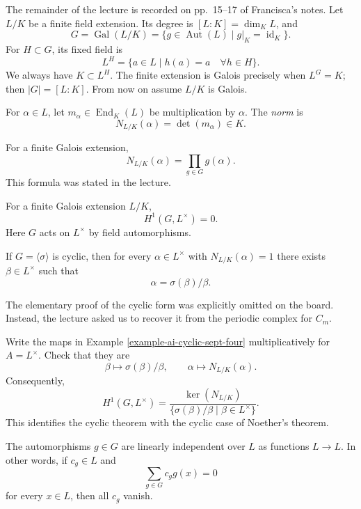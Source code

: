 \noindent
The remainder of the lecture is recorded
on pp.~15--17 of Francisca's notes.
Let $L/K$ be a finite field extension.
Its degree is $[L:K]=\dim_K L$, and
$$
G=\operatorname{Gal}(L/K)
=\{g\in\operatorname{Aut}(L)\mid
g|_K=\operatorname{id}_K\}.
$$
For $H\subset G$, its fixed field is
$$
L^H=\{a\in L\mid h(a)=a
\quad\forall h\in H\}.
$$
We always have $K\subset L^H$.
The finite extension is Galois precisely
when $L^G=K$; then $|G|=[L:K]$.
From now on assume $L/K$ is Galois.

\begin{definition}
\label{definition-galois-norm-4-sept}
For $\alpha\in L$, let
$m_\alpha\in\operatorname{End}_K(L)$
be multiplication by $\alpha$.
The \emph{norm} is
$$
N_{L/K}(\alpha)=\det(m_\alpha)\in K.
$$
\end{definition}

\noindent
For a finite Galois extension,
$$
N_{L/K}(\alpha)=\prod_{g\in G}g(\alpha).
$$
This formula was stated in the lecture.

\begin{theorem}[Noether]
\label{theorem-noether-hilbert-90-4-sept}
For a finite Galois extension $L/K$,
$$
H^1(G,L^{\times})=0.
$$
Here $G$ acts on $L^{\times}$ by field
automorphisms.
\end{theorem}

\begin{theorem}
\label{theorem-hilbert-90-cyclic-4-sept}
If $G=\langle\sigma\rangle$ is cyclic,
then for every $\alpha\in L^{\times}$
with $N_{L/K}(\alpha)=1$ there exists
$\beta\in L^{\times}$ such that
$$
\alpha=\sigma(\beta)/\beta.
$$
\end{theorem}

\noindent
The elementary proof of the cyclic form
was explicitly omitted on the board.
Instead, the lecture asked us to recover
it from the periodic complex for $C_m$.

\begin{exercise}
\label{exercise-hilbert-90-cyclic-4-sept}
Write the maps in Example
\ref{example-ai-cyclic-sept-four}
multiplicatively for $A=L^{\times}$.
Check that they are
$$
\beta\longmapsto\sigma(\beta)/\beta,
\qquad \alpha\longmapsto N_{L/K}(\alpha).
$$
Consequently,
$$
H^1(G,L^{\times})
=\frac{\ker(N_{L/K})}
{\{\sigma(\beta)/\beta
\mid\beta\in L^{\times}\}}.
$$
This identifies the cyclic theorem with
the cyclic case of Noether's theorem.
\end{exercise}

\begin{lemma}
\label{lemma-artin-4-sept}
The automorphisms $g\in G$ are linearly
independent over $L$ as functions $L\to L$.
In other words, if $c_g\in L$ and
$$
\sum_{g\in G}c_g g(x)=0
$$
for every $x\in L$, then all $c_g$ vanish.
\end{lemma}

